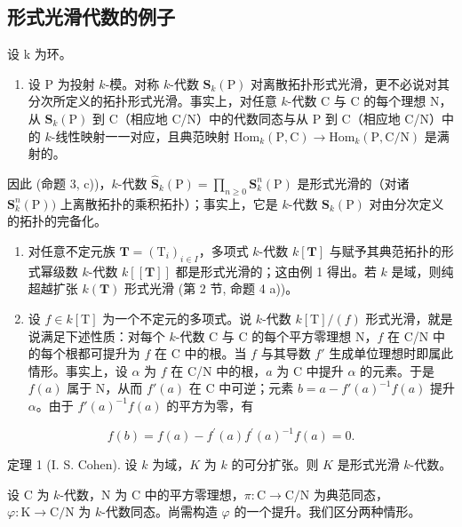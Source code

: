 \subsection{形式光滑代数的例子}

设 k 为环。

\begin{enumerate}
\def\labelenumi{\arabic{enumi})}
\tightlist
\item
  设 P 为投射 \(k\)-模。对称 \(k\)-代数 \(\mathbf{S}_k(\mathrm{P})\) 对离散拓扑形式光滑，更不必说对其分次所定义的拓扑形式光滑。事实上，对任意 \(k\)-代数 C 与 C 的每个理想 N，从 \(\mathbf{S}_k(\mathrm{P})\) 到 C（相应地 C/N）中的代数同态与从 P 到 C（相应地 C/N）中的 \(k\)-线性映射一一对应，且典范映射 \(\mathrm{Hom}_k(\mathrm{P},\mathrm{C}) \to \mathrm{Hom}_k(\mathrm{P},\mathrm{C}/\mathrm{N})\) 是满射的。
\end{enumerate}

因此 (命题 3, c))，\(k\)-代数 \(\widehat{\mathbf{S}}_k(\mathrm{P}) = \prod_{n\geqslant 0}\mathbf{S}_k^n (\mathrm{P})\) 是形式光滑的（对诸 \(\mathbf{S}_k^n (\mathrm{P}))\) 上离散拓扑的乘积拓扑）；事实上，它是 \(k\)-代数 \(\mathbf{S}_k(\mathrm{P})\) 对由分次定义的拓扑的完备化。

\begin{enumerate}
\def\labelenumi{\arabic{enumi})}
\setcounter{enumi}{1}
\item
  对任意不定元族 \(\mathbf{T} = (\mathrm{T}_i)_{i\in I}\)，多项式 \(k\)-代数 \(k[\mathbf{T}]\) 与赋予其典范拓扑的形式幂级数 \(k\)-代数 \(k[[\mathbf{T}]]\) 都是形式光滑的；这由例 1 得出。若 \(k\) 是域，则纯超越扩张 \(k(\mathbf{T})\) 形式光滑 (第 2 节, 命题 4 a))。
\item
  设 \(f \in k[\mathrm{T}]\) 为一个不定元的多项式。说 \(k\)-代数 \(k[\mathrm{T}]/(f)\) 形式光滑，就是说满足下述性质：对每个 \(k\)-代数 C 与 C 的每个平方零理想 N，\(f\) 在 C/N 中的每个根都可提升为 \(f\) 在 C 中的根。当 \(f\) 与其导数 \(f'\) 生成单位理想时即属此情形。事实上，设 \(\alpha\) 为 \(f\) 在 C/N 中的根，\(a\) 为 C 中提升 \(\alpha\) 的元素。于是 \(f(a)\) 属于 N，从而 \(f'(a)\) 在 C 中可逆；元素 \(b = a - f'(a)^{-1}f(a)\) 提升 \(\alpha\)。由于 \(f'(a)^{-1}f(a)\) 的平方为零，有
\end{enumerate}

\[
f (b) = f (a) - f ^ {\prime} (a) f ^ {\prime} (a) ^ {- 1} f (a) = 0.
\]

定理 1 (I. S. Cohen). 设 \(k\) 为域，\(K\) 为 \(k\) 的可分扩张。则 \(K\) 是形式光滑 \(k\)-代数。

设 C 为 \(k\)-代数，N 为 C 中的平方零理想，\(\pi: \mathrm{C} \to \mathrm{C/N}\) 为典范同态，\(\varphi: \mathrm{K} \to \mathrm{C/N}\) 为 \(k\)-代数同态。尚需构造 \(\varphi\) 的一个提升。我们区分两种情形。

